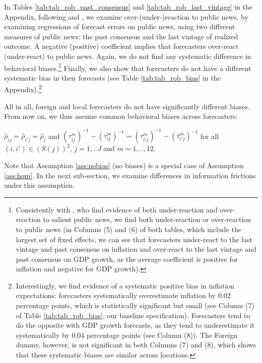 In Tables \ref{tab:tab_rob_past_consensus} and \ref{tab:tab_rob_last_vintage} in the Appendix, following \citet{BroerKohlhas2019} and \citet{GemmiValchev2021}, we examine over-(under-)reaction to public news, by examining regressions of forecast errors on public news, using two different measures of public news: the past consensus and the last vintage of realized outcome. A negative (positive) coefficient implies that forecasters over-react (under-react) to public news. Again, we do not find any systematic difference in behavioral biases.\footnote{Consistently with \citet{BroerKohlhas2019}, who find evidence of both under-reaction and over-reaction to salient public news, we find both under-reaction or over-reaction to public news (in Columns (5) and (6) of both tables, which include the largest set of fixed effects, we can see that forecasters under-react to the last vintage and past consensus on inflation and over-react to the last vintage and past consensus on GDP growth, as the average coefficient is positive for inflation and negative for GDP growth).} Finally, we also show that forecasters do not have a different systematic bias in their forecasts (see Table \ref{tab:tab_rob_bias} in the Appendix).\footnote{Interestingly, we find evidence of a systematic positive bias in inflation expectations: forecasters systematically overestimate inflation by 0.02 percentage points, which is statistically significant but small (see Column (7) of Table \ref{tab:tab_rob_bias}, our baseline specification). Forecasters tend to do the opposite with GDP growth forecasts, as they tend to underestimate it systematically by 0.04 percentage points (see Column (8)). The Foreign dummy, however, is not significant in both Columns (7) and (8), which shows that these systematic biases are similar across locations.}

All in all, foreign and local forecasters do not have significantly different biases. From now on, we thus assume common behavioral biases across forecasters:
\begin{assumption}\label{ass:hom} $\hat\rho_{ij}=\hat\rho_{i'j}=\hat\rho_{j}$ and $(\tau_{ij}^m)^{-1}-(\hat\tau_{ij}^m)^{-1}=(\tau_{i'j}^m)^{-1}-(\hat\tau_{i'j}^m)^{-1}$ for all $(i,i')\in(\textit{S}(j))^2$, $j=1,..J$ and $m=1,..,12$.
\end{assumption}
Note that Assumption \ref{ass:nobias} (no biases)  is a special case of Assumption \ref{ass:hom}.
In the next sub-section, we examine differences in information frictions under this assumption.
